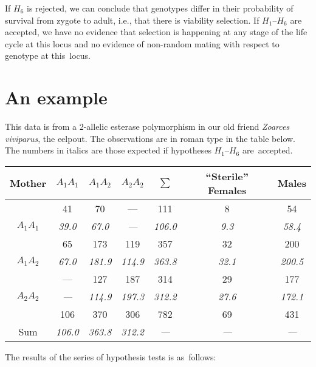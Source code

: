\documentclass[12pt]{article}
\begin{document}
\noindent If $H_6$ is rejected, we can conclude that genotypes differ
in their probability of survival from zygote to adult, i.e., that
there is viability selection.  If $H_1$--$H_6$ are accepted, we have
no evidence that selection is happening at any stage of the life cycle
at this locus and no evidence of non-random mating with respect to
genotype at this~locus.

\section*{An example}

This data is from a 2-allelic esterase polymorphism in our old friend
{\it Zoarces viviparus}, the eelpout.  The observations are in roman
type in the table below.  The numbers in italics are those expected if
hypotheses $H_1$--$H_6$ are~accepted.

\begin{center}
\begin{tabular}{c|ccc|c|cc}
Mother & $A_{1}A_{1}$ & $A_{1}A_{2}$ & $A_{2}A_{2}$ & $\sum$ & 
``Sterile'' Females & Males\\
\hline 
             & 41          & 70          & ---         & 111   
& 8          &  54\\
$A_{1}A_{1}$ & {\it 39.0}  & {\it 67.0}  & {\it ---}   & {\it 106.0} 
& {\it 9.3}  & {\it 58.4}\\
             & 65          & 173         & 119         & 357
& 32         & 200\\
$A_{1}A_{2}$ & {\it 67.0}  & {\it 181.9} & {\it 114.9} & {\it 363.8} 
& {\it 32.1} & {\it 200.5}\\
             & ---         & 127         & 187         & 314
& 29         & 177\\
$A_{2}A_{2}$ & {\it ---}   & {\it 114.9} & {\it 197.3} & {\it 312.2} 
& {\it 27.6} & {\it 172.1}\\
\hline 
             & 106         & 370         & 306         & 782
& 69         & 431\\
Sum          &  {\it 106.0} & {\it 363.8} & {\it 312.2} & {\it ---}
& {\it ---}  & {\it ---}\\
\end{tabular}
\end{center}

\noindent The results of the series of hypothesis tests is as~follows:
\end{document}
